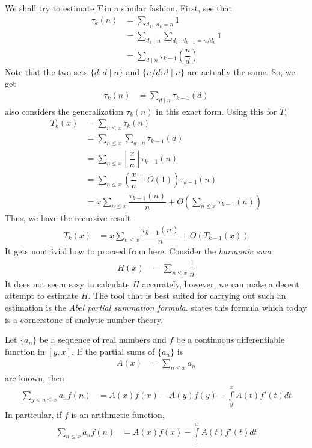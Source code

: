 \documentclass[elemannt.tex]{subfile}
\begin{document}
	We shall try to estimate $T$ in a similar fashion. First, see that
		\begin{align*}
			\tau_{k}(n)
				& = \sum_{d_{1}\cdots d_{k}=n}1\\
				& = \sum_{d_{k}\mid n}\sum_{d_{1}\cdots d_{k-1}=n/d_{k}}1\\
				& = \sum_{d\mid n}\tau_{k-1}\left(\dfrac{n}{d}\right)
		\end{align*}
	Note that the two sets $\{d:d\mid n\}$ and $\{n/d:d\mid n\}$ are actually the same. So, we get
		\begin{align*}
			\tau_{k}(n)
				& = \sum_{d\mid n}\tau_{k-1}(d)
		\end{align*}
	\textcite[($\S$8)]{beumer_1962} also considers the generalization $\tau_{k}(n)$ in this exact form. Using this for $T$,
		\begin{align*}
			T_{k}(x)
				& = \sum_{n\leq x}\tau_{k}(n)\\
				& = \sum_{n\leq x}\sum_{d\mid n}\tau_{k-1}(d)\\
				& = \sum_{n\leq x}\left\lfloor{\dfrac{x}{n}}\right\rfloor\tau_{k-1}(n)\\
				& = \sum_{n\leq x}\left(\dfrac{x}{n}+O(1)\right)\tau_{k-1}(n)\\
				& = x\sum_{n\leq x}\dfrac{\tau_{k-1}(n)}{n}+O\left(\sum_{n\leq x}\tau_{k-1}(n)\right)
		\end{align*}
	Thus, we have the recursive result
		\begin{align*}
			T_{k}(x)
				& = x\sum_{n\leq x}\dfrac{\tau_{k-1}(n)}{n}+O(T_{k-1}(x))
		\end{align*}
	It gets nontrivial how to proceed from here. Consider the \textit{harmonic sum}
		\begin{align*}
			H(x)
			& = \sum_{n\leq x}\dfrac{1}{n}
		\end{align*}
	It does not seem easy to calculate $H$ accurately, however, we can make a decent attempt to estimate $H$. The tool that is best suited for carrying out such an estimation is the \textit{Abel partial summation formula}. \textcite{abel_1826} states this formula which today is a cornerstone of analytic number theory.
		\begin{theorem}\label{thm:abel}
			Let $\{a_{n}\}$ be a sequence of real numbers and $f$ be a continuous differentiable function in $[y,x]$. If the partial sums of $\{a_{n}\}$ is
				\begin{align*}
					A(x)
						& = \sum_{n\leq x}a_{n}
				\end{align*}
			are known, then
				\begin{align*}
					\sum_{y<n\leq x}a_{n}f(n)
						& = A(x)f(x)-A(y)f(y)-\int\limits_{y}^{x}A(t)f'(t)dt
				\end{align*}
			In particular, if $f$ is an arithmetic function,
				\begin{align*}
					\sum_{n\leq x}a_{n}f(n)
						& = A(x)f(x)-\int\limits_{1}^{x}A(t)f'(t)dt
				\end{align*}
		\end{theorem}
		
\end{document}
